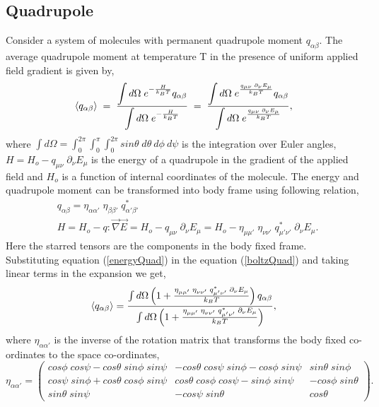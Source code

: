\subsection{Quadrupole}
\label{subsec:boltzAverage-Quad}
Consider a system of molecules with permanent quadrupole moment $q_{\alpha\beta} $. The average quadrupole moment at temperature T in the presence of uniform applied field gradient is given by,\cite{AduGyamfi78, AduGyamfi81}
\begin{equation}
\braket{q_{\alpha\beta}} \;=\; \frac{\displaystyle\int d\Omega\; e^{-\frac{H}{k_B T}}q_{\alpha\beta}}{\displaystyle\int d\Omega\; e^{-\frac{H}{k_B T}}} \;=\; \frac{\displaystyle\int d\Omega\; e^{\frac{q_{\mu\nu}\;\partial_\nu E_\mu}{k_B T}}q_{\alpha\beta}}{\displaystyle\int d\Omega\; e^{\frac{q_{\mu\nu}\;\partial_\nu E_\mu}{k_B T}}},
\label{boltzQuad}
\end{equation}
where $\int d\Omega = \int_0^{2\pi} \int_0^\pi \int_0^{2\pi}
sin\theta\; d\theta\ d\phi\ d\psi$ is the integration over Euler
angles, $ H = H_o -q_{\mu\nu}\;\partial_\nu E_\mu $ is the energy of
a quadrupole in the gradient of the  
applied field and $ H_o$ is a function of internal coordinates of the molecule. The energy and quadrupole moment can be transformed into body frame using following relation, 
\begin{equation}
\begin{split}
&q_{\alpha\beta} = \eta_{\alpha\alpha'}\;\eta_{\beta\beta'}\;{q}^* _{\alpha'\beta'} \\
&H = H_o - q:\vec{\nabla}\vec{E} = H_o - q_{\mu\nu}\;\partial_\nu E_\mu = H_o -\eta_{\mu\mu'}\;\eta_{\nu\nu'}\;{q}^*_{\mu'\nu'}\;\partial_\nu E_\mu.
\end{split}
\label{energyQuad}
\end{equation}
Here the starred tensors are the components in the body fixed
frame. Substituting equation (\ref{energyQuad}) in the equation (\ref{boltzQuad})
and taking linear terms in the expansion we get,
\begin{equation}
\braket{q_{\alpha\beta}} = \frac{ \int d\Omega \left(1 + \frac{\eta_{\mu\mu'}\;\eta_{\nu\nu'}\;{q}^*_{\mu'\nu'}\;\partial_\nu E_\mu }{k_B T}\right)q_{\alpha\beta}}{ \int d\Omega \left(1 + \frac{\eta_{\mu\mu'}\;\eta_{\nu\nu'}\;{q}^*_{\mu'\nu'}\;\partial_\nu E_\mu }{k_B T}\right)},
\end{equation}
where $\eta_{\alpha\alpha'}$ is the inverse of the rotation matrix that transforms
the body fixed co-ordinates to the space co-ordinates,
\[\eta_{\alpha\alpha'} 
= \left(\begin{array}{ccc}
cos\phi\; cos\psi - cos\theta\; sin\phi\; sin\psi & -cos\theta\; cos\psi\; sin\phi - cos\phi\; sin\psi & sin\theta\; sin\phi \\
cos\psi\; sin\phi + cos\theta\; cos\phi \; sin\psi & cos\theta\; cos\phi\; cos\psi - sin\phi\; sin\psi & -cos\phi\; sin\theta \\
sin\theta\; sin\psi & -cos\psi\; sin\theta & cos\theta
\end{array} \right).\]
